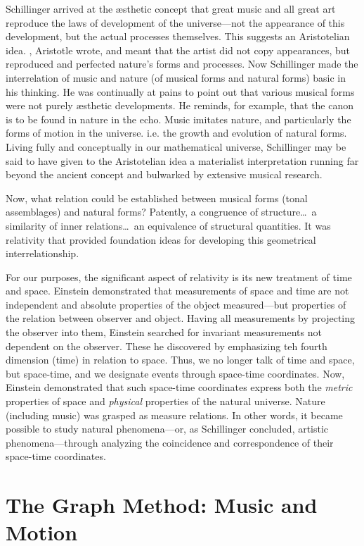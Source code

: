 Schillinger arrived at the \ae sthetic concept that great music and all great
art reproduce the laws of development of the universe---not the appearance of
this development, but the actual processes themselves. This suggests an
Aristotelian idea. , Aristotle wrote, and meant that
the artist did not copy appearances, but reproduced and perfected nature's
forms and processes. Now Schillinger made the interrelation of music and nature
(of musical forms and natural forms) basic in his thinking. He was continually
at pains to point out that various musical forms were not purely \ae sthetic
developments. He reminds, for example, that the canon is to be found in nature
in the echo. Music imitates nature, and particularly the forms of motion in the
universe. i.e. the growth and evolution of natural forms. Living fully and
conceptually in our mathematical universe, Schillinger may be said to have
given to the Aristotelian idea a materialist interpretation running far beyond
the ancient concept and bulwarked by extensive musical research.

Now, what relation could be established between musical forms (tonal
assemblages) and natural forms? Patently, a congruence of structure\dots\ a
similarity of inner relations\dots\ an equivalence of structural quantities. It
was relativity that provided foundation ideas for developing this geometrical
interrelationship.

For our purposes, the significant aspect of relativity is its new treatment of
time and space. Einstein demonstrated that measurements of space and time are
not independent and absolute properties of the object measured---but properties
of the relation between observer and object. Having  all
measurements by projecting the observer into them, Einstein searched for
invariant measurements not dependent on the observer. These he discovered by
emphasizing teh fourth dimension (time) in relation to space. Thus, we no
longer talk of time and space, but space-time, and we designate events through
space-time coordinates. Now, Einstein demonstrated that such space-time
coordinates express both the \textit{metric} properties of space and
\textit{physical} properties of the natural universe. Nature (including music)
was grasped as measure relations. In other words, it became possible to study
natural phenomena---or, as Schillinger concluded, artistic phenomena---through
analyzing the coincidence and correspondence of their space-time coordinates.

\section{The Graph Method: Music and Motion}

